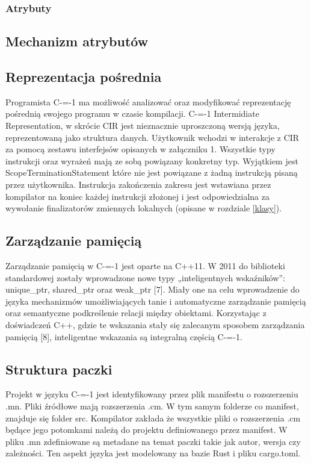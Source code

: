 \subsubsection{Atrybuty}
\subsection{Mechanizm atrybutów}
\subsection{Reprezentacja pośrednia}\label{reprezentacja_posrednia}
Programista C-=-1 ma możliwość analizować oraz modyfikować reprezentację pośrednią swojego programu w czasie kompilacji. C-=-1 Intermidiate Representation, w skrócie CIR jest nieznacznie uproszczoną wersją języka, reprezentowaną jako struktura danych.
Użytkownik wchodzi w interakcje z CIR za pomocą zestawu interfejsów opisanych w załączniku 1. Wszystkie typy instrukcji oraz wyrażeń mają ze sobą powiązany konkretny typ. Wyjątkiem jest ScopeTerminationStatement które nie jest powiązane z żadną instrukcją pisaną przez użytkownika. Instrukcja zakończenia zakresu jest wstawiana przez kompilator na koniec każdej instrukcji złożonej i jest odpowiedzialna za wywołanie finalizatorów zmiennych lokalnych (opisane w rozdziale \ref{klasy}).
\subsection{Zarządzanie pamięcią}
Zarządzanie pamięcią w C-=-1 jest oparte na C++11. W 2011 do biblioteki standardowej zostały wprowadzone nowe typy „inteligentnych wskaźników”: unique\_ptr, shared\_ptr oraz weak\_ptr [7]. Miały one na celu wprowadzenie do języka mechanizmów umożliwiających tanie i automatyczne zarządzanie pamięcią oraz semantyczne podkreślenie relacji między obiektami.
Korzystając z doświadczeń C++, gdzie te wskazania stały się zalecanym sposobem zarządzania pamięcią [8], inteligentne wskazania są integralną częścią C-=-1.
\subsection{Struktura paczki}\label{struktura_paczki}
Projekt w języku C-=-1 jest identyfikowany przez plik manifestu o rozszerzeniu .mn. Pliki źródłowe mają rozszerzenia .cm. W tym samym folderze co manifest, znajduje się folder src. Kompilator zakłada że wszystkie pliki o rozszerzenia .cm będące jego potomkami należą do projektu definiowanego przez manifest.
W pliku .mn zdefiniowane są metadane na temat paczki takie jak autor, wersja czy zależności. Ten aspekt języka jest modelowany na bazie Rust i pliku cargo.toml.
